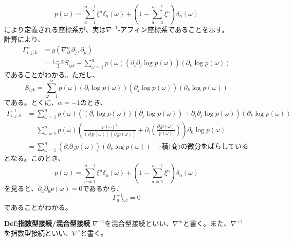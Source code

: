 \documentclass[a4paper,11pt]{jsarticle}
\numberwithin{equation}{section}
\begin{document}
\begin{equation}
    p(\omega) = \sum_{a=1}^{n-1} \xi^a \delta_a(\omega) +\left(1-\sum_{a=1}^{n-1} \xi^a \right) \delta_n(\omega)
\end{equation}
により定義される座標系が、実は$\nabla^{-1}$-アフィン座標系であることを示す。\\

計算により、%
\begin{align}
    \Gamma_{i,j,k}^{\alpha} &=g(\nabla_{\partial_i}^{\alpha} \partial_j,\partial_k)\\
    &= \frac{1-\alpha}{2} S_{ijk} + \sum_{\omega=1}^{n} p(\omega) (\partial_i \partial_j \log p(\omega))(\partial_k \log p(\omega))
\end{align}
であることがわかる。ただし、
\begin{equation}
    S_{ijk} = \sum_{\omega=1}^{n} p(\omega) (\partial_i \log p(\omega))(\partial_j \log p(\omega))(\partial_k \log p(\omega))
\end{equation}
である。とくに、$\alpha = -1$のとき、
\begin{align}
    \Gamma_{i,j,k}^{-1} &= \sum_{\omega=1}^{n} p(\omega) ((\partial_i\log p(\omega))( \partial_j \log p(\omega))+\partial_i \partial_j \log p(\omega))(\partial_k \log p(\omega))\\
    &= \sum_{\omega=1}^{n} p(\omega) \left( \frac{p(\omega)^2}{(\partial_i p(\omega))(\partial_j p(\omega))} + \partial_i \left(\frac{\partial_j p(\omega)}{p(\omega)}\right) \right) \partial_k \log p(\omega)\\
    &= \sum_{\omega=1}^{n} (\partial_i \partial_j p(\omega)) (\partial_k \log p(\omega)) \quad \because \text{積(商)の微分をばらしている}
\end{align}
となる。このとき、
\begin{equation}
    p(\omega) = \sum_{a=1}^{n-1} \xi^a \delta_a(\omega) +\left(1-\sum_{a=1}^{n-1} \xi^a \right) \delta_n(\omega)
\end{equation}
を見ると、$\partial_a \partial_b p(\omega) = 0$であるから、
\begin{equation}
    \Gamma_{a,b,c}^{-1} = 0
\end{equation}
であることがわかる。\hfill\qedsymbol\\

\begin{itembox}[l]{\textbf{Def:指数型接続/混合型接続}}
    $\nabla^{-1}$を混合型接続といい、$\nabla^{m}$と書く。また、$\nabla^{+1}$を指数型接続といい、$\nabla^{e}$と書く。

\end{itembox}
\end{document}
